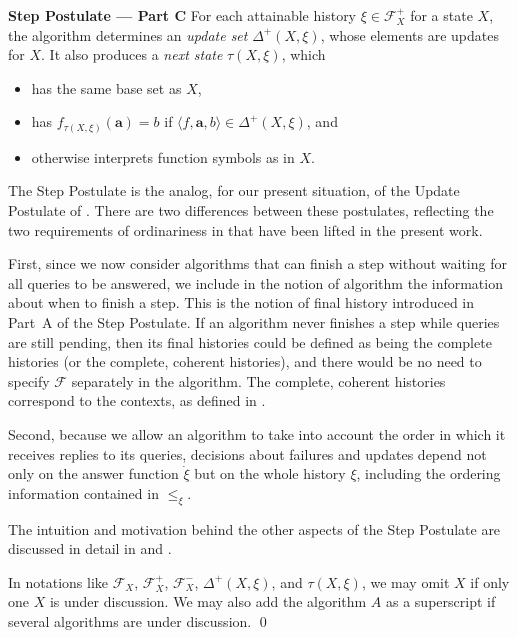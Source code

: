 \documentclass{LMCS}
\theoremstyle{definition}
\newenvironment{ls}{\begin{itemize}}{\end{itemize}}
\newenvironment{unn}[1]{\bigskip\noindent\textbf{#1}\quad}{\par\bigskip}
\newcommand{\DD}{\Delta^+}
\newcommand{\ans}{\dot}
\newcommand{\bld}[1]{\ensuremath{\mathbf {#1}}}
\newcommand{\scr}[1]{\ensuremath{\mathcal {#1}}}
\newcommand{\sq}[1]{\ensuremath{\langle#1\rangle}}
\begin{document}
\begin{unn}{Step Postulate --- Part C}
For each attainable history $\xi\in\scr F^+_X$ for a state $X$, the
algorithm determines an \emph{update set} $\DD(X,\xi)$, whose elements
are updates for $X$.  It also produces a \emph{next state}
$\tau(X,\xi)$, which
\begin{ls}
  \item has the same base set as $X$,
  \item has $f_{\tau(X,\xi)}(\bld a)=b$ if $\sq{f,\bld
  a,b}\in\DD(X,\xi)$, and
  \item otherwise interprets function symbols as in $X$.
\end{ls}
\end{unn}

The Step Postulate is the analog, for our present situation, of the
Update Postulate of \cite{oa1}.  There are two differences between
these postulates, reflecting the two requirements of ordinariness in
\cite{oa1} that have been lifted in the present work.

First, since we now consider algorithms that can finish a step
without waiting for all queries to be answered, we include in the
notion of algorithm the information about when to finish a step.
This is the notion of final history introduced in Part~A of the Step
Postulate. If an algorithm never finishes a step while queries are
still pending, then its final histories could be defined as being
the complete histories (or the complete, coherent histories), and
there would be no need to specify \scr F separately in the
algorithm.  The complete, coherent histories correspond to the
contexts, as defined in \cite{oa1}.

Second, because we allow an algorithm to take into account the order
in which it receives replies to its queries, decisions about failures
and updates depend not only on the answer function $\ans\xi$ but on
the whole history $\xi$, including the ordering information contained
in $\leq_\xi$.

The intuition and motivation behind the other aspects of the Step
Postulate are discussed in detail in \cite{seqth} and \cite{oa1}.

\begin{conv}
  In notations like $\scr F_X$, $\scr F^+_X$, $\scr F^-_X$, $\DD(X,\xi)$, and
  $\tau(X,\xi)$, we may omit $X$ if only one $X$ is under discussion.  We
  may also add the algorithm $A$ as a superscript if several
  algorithms are under discussion.
\qed\end{conv}
\end{document}
